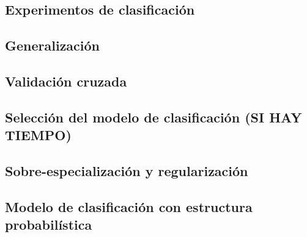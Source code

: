 \subsection{Experimentos de clasificación}

\subsection{Generalización}

\subsection{Validación cruzada}

\subsection{Selección del modelo de clasificación (SI HAY TIEMPO)}

\subsection{Sobre-especialización y regularización}

\subsection{Modelo de clasificación con estructura probabilística}
